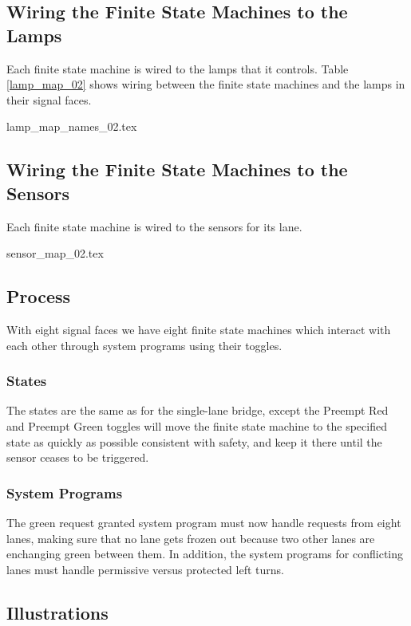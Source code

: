 \documentclass[letterpaper,twoside]{article}
\begin{document}
\subsection{Wiring the Finite State Machines to the Lamps}

Each finite state machine is wired to the lamps that
it controls.  Table \ref{lamp_map_02} shows wiring between the
finite state machines and the lamps in their signal faces.

 {lamp_map_names_02.tex}

\subsection{Wiring the Finite State Machines to the Sensors}
\label{subsection:wiring_sensors_02}

Each finite state machine is wired to the sensors
for its lane.

 {sensor_map_02.tex}

\subsection{Process}

With eight signal faces we have eight finite state machines which
interact with each other through system programs using their
toggles.

\subsubsection{States}

The states are the same as for the single-lane bridge,
except the Preempt Red and Preempt Green toggles will move the
finite state machine
to the specified state as quickly as possible consistent with
safety, and keep it there until the sensor ceases to be triggered.

\subsubsection{System Programs}

The green request granted system program must now handle requests
from eight lanes, making sure that no lane gets frozen out because
two other lanes are enchanging green between them.  In addition,
the system programs for conflicting lanes must handle permissive
versus protected left turns.

\subsection{Illustrations}
\end{document}
